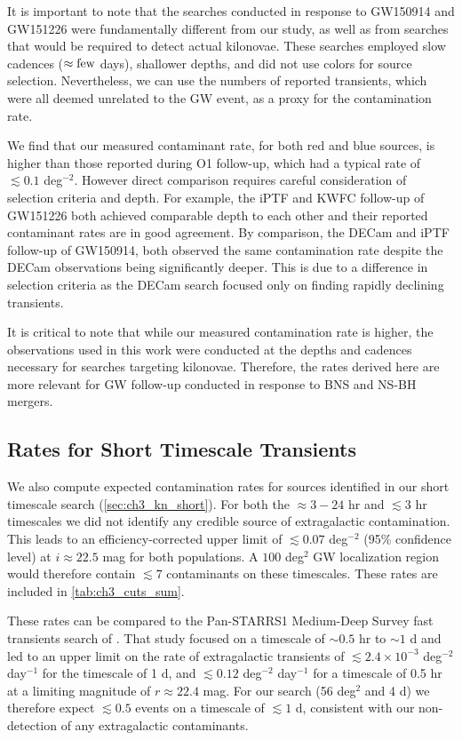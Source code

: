 It is important to note that the searches conducted in response to GW150914 and GW151226 were fundamentally different from our study, as well as from searches that would be required to detect actual kilonovae. These searches employed slow cadences ($\approx \rm few$ days), shallower depths, and did not use colors for source selection. Nevertheless, we can use the numbers of reported transients, which were all deemed unrelated to the GW event, as a proxy for the contamination rate.

We find that our measured contaminant rate, for both red and blue sources, is higher than those reported during O1 follow-up, which had a typical rate of  $\lesssim 0.1$ deg$^{-2}$. However direct comparison requires careful consideration of selection criteria and depth. For example, the iPTF and KWFC follow-up of GW151226 both achieved comparable depth to each other and their reported contaminant rates are in good agreement. By comparison, the DECam and iPTF follow-up of GW150914, both observed the same contamination rate despite the DECam observations being significantly deeper. This is due to a difference in selection criteria as the DECam search focused only on finding rapidly declining transients.

It is critical to note that while our measured contamination rate is higher, the observations used in this work were conducted at the depths and cadences necessary for searches targeting kilonovae. Therefore, the rates derived here are more relevant for GW follow-up conducted in response to BNS and NS-BH mergers.

\subsection{Rates for Short Timescale Transients}
\label{sec:ch3_rates_short}

We also compute expected contamination rates for sources identified in our short timescale search (\cref{sec:ch3_kn_short}). For both the $\approx 3-24$ hr and $\lesssim 3$ hr timescales we did not identify any credible source of extragalactic contamination. This leads to an efficiency-corrected upper limit of $\lesssim 0.07$ deg$^{-2}$ (95\% confidence level) at $i\approx 22.5$ mag for both populations. A $100$ deg$^2$ GW localization region would therefore contain $\lesssim 7$ contaminants on these timescales. These rates are included in \cref{tab:ch3_cuts_sum}.

These rates can be compared to the Pan-STARRS1 Medium-Deep Survey fast transients search of \cite{Berger+13}. That study focused on a timescale of $\sim 0.5$ hr to $\sim 1$ d and led to an upper limit on the rate of extragalactic transients of $\lesssim 2.4\times 10^{-3}$ deg$^{-2}$ day$^{-1}$ for the timescale of 1 d, and $\lesssim 0.12$ deg$^{-2}$ day$^{-1}$ for a timescale of 0.5 hr at a limiting magnitude of $r\approx 22.4$ mag. For our search (56 deg$^2$ and 4 d) we therefore expect $\lesssim 0.5$ events on a timescale of $\lesssim 1$ d, consistent with our non-detection of any extragalactic contaminants.

